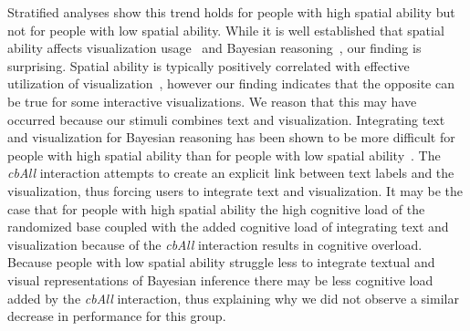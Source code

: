 Stratified analyses show this trend holds for people with high spatial ability but not for people with low spatial ability. While it is well established that spatial ability affects visualization usage~\cite{liu2020Survey} and Bayesian reasoning~\cite{ottley2016Bayesian}, our finding is surprising.
Spatial ability is typically positively correlated with effective utilization of visualization~\cite{liu2020Survey}, however our finding indicates that the opposite can be true for some interactive visualizations. We reason that this may have occurred 
because our stimuli combines text and visualization. Integrating text and visualization for Bayesian reasoning has been shown to be more difficult for people with high spatial ability than for people with low spatial ability~\cite{ottley2016Bayesian}. The \textit{cbAll} interaction attempts to create an explicit link between text labels and the visualization, thus forcing users to integrate text and visualization. It may be the case that for people with high spatial ability the high cognitive load of the randomized base coupled with the added cognitive load of integrating text and visualization because of the \textit{cbAll} interaction results in cognitive overload. Because people with low spatial ability struggle less to integrate textual and visual representations of Bayesian inference there may be less cognitive load added by the \textit{cbAll} interaction, thus explaining why we did not observe a similar decrease in performance for this group.  



